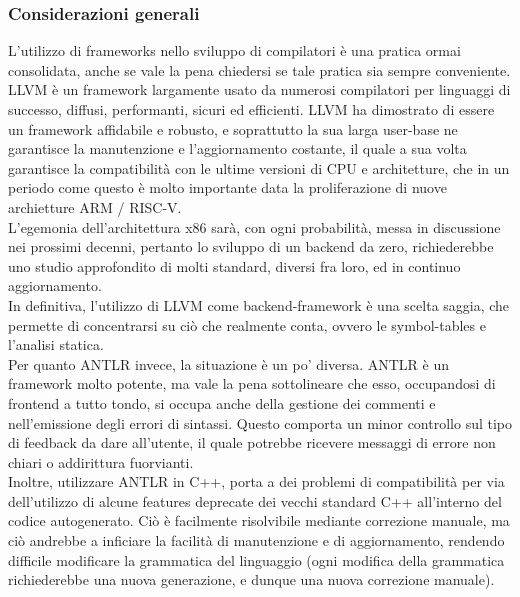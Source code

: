 \subsubsection{Considerazioni generali}
L'utilizzo di frameworks nello sviluppo di compilatori è una pratica ormai consolidata, anche se vale 
la pena chiedersi se tale pratica sia sempre conveniente. \\ 

LLVM è un framework largamente usato 
da numerosi compilatori per linguaggi di successo, diffusi, performanti, sicuri ed efficienti. LLVM ha 
dimostrato di essere un framework affidabile e robusto, e soprattutto la sua larga user-base ne garantisce
la manutenzione e l'aggiornamento costante, il quale a sua volta garantisce la compatibilità con le ultime
versioni di CPU e architetture, che in un periodo come questo è molto importante data la proliferazione di 
nuove archietture ARM / RISC-V. \\

L'egemonia dell'architettura x86 sarà, con ogni
probabilità, messa in discussione nei prossimi decenni, pertanto lo sviluppo di un backend da zero, richiederebbe
uno studio approfondito di molti standard, diversi fra loro, ed in continuo aggiornamento.  \\ 

In definitiva, l'utilizzo di LLVM come backend-framework è una scelta saggia, che permette di concentrarsi
su ciò che realmente conta, ovvero le symbol-tables e l'analisi statica. \\

Per quanto ANTLR invece, la situazione è un po' diversa. ANTLR è un framework molto potente, ma vale la pena 
sottolineare che esso, occupandosi di frontend a tutto tondo, si occupa anche della gestione dei commenti e nell'emissione
degli errori di sintassi. Questo comporta un minor controllo sul tipo di feedback da dare all'utente, il quale potrebbe
ricevere messaggi di errore non chiari o addirittura fuorvianti. \\

Inoltre, utilizzare ANTLR in C++, porta a dei problemi di compatibilità per via dell'utilizzo di alcune features 
deprecate dei vecchi standard C++ all'interno del codice autogenerato. Ciò è facilmente risolvibile mediante 
correzione manuale, ma ciò andrebbe a inficiare la facilità di manutenzione e di aggiornamento, rendendo difficile 
modificare la grammatica del linguaggio (ogni modifica della grammatica richiederebbe una nuova generazione, 
e dunque una nuova correzione manuale). \\